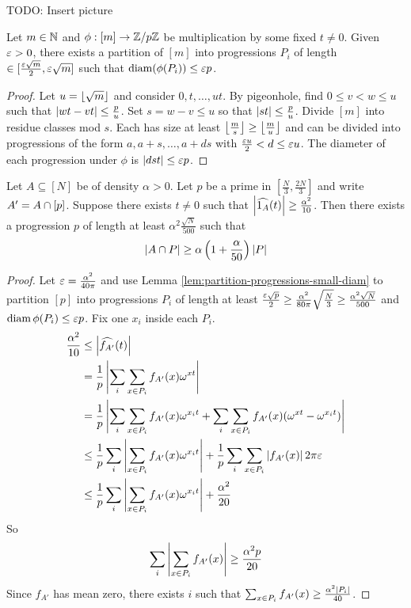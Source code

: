 \documentclass{article}
\begin{document}
TODO: Insert picture

\begin{nlemma}\label{lem:partition-progressions-small-diam}
  Let $m \in \mathbb N$ and $\phi : [m] \to \mathbb Z/p\mathbb Z$ be multiplication by some fixed $t \ne 0$. Given $\varepsilon > 0$, there exists a partition of $[m]$ into progressions $P_i$ of length $\in [\frac{\varepsilon\sqrt m}2, \varepsilon\sqrt m]$ such that $\operatorname{diam}(\phi(P_i)) \le \varepsilon p$.
\end{nlemma}
\begin{proof}
  Let $u = \left\lfloor \sqrt m\right\rfloor$ and consider $0, t, \dots, ut$. By pigeonhole, find $0 \le v < w \le u$ such that $\left\lvert wt - vt\right\rvert \le \frac pu$. Set $s = w - v \le u$ so that $\left\lvert st\right\rvert \le \frac pu$. Divide $[m]$ into residue classes mod $s$. Each has size at least $\left\lfloor \frac ms\right\rfloor \ge \left\lfloor \frac mu\right\rfloor$ and can be divided into progressions of the form $a, a + s, \dots, a + ds$ with $\frac{\varepsilon u}2 < d \le \varepsilon u$. The diameter of each progression under $\phi$ is $\left\lvert dst\right\rvert \le \varepsilon p$.
\end{proof}

\begin{nlemma}
  Let $A \subseteq [N]$ be of density $\alpha > 0$. Let $p$ be a prime in $[\frac N3, \frac{2N}3]$ and write $A' = A \cap [p]$. Suppose there exists $t \ne 0$ such that $\left\lvert \widehat{1_A}(t)\right\rvert \ge \frac{\alpha^2}{10}$. Then there exists a progression $p$ of length at least $\alpha^2 \frac{\sqrt N}{500}$ such that
  $$\left\lvert A \cap P\right\rvert \ge \alpha\left(1 + \frac\alpha{50}\right)\left\lvert P\right\rvert$$
\end{nlemma}
\begin{proof}
  Let $\varepsilon = \frac{\alpha^2}{40\pi}$ and use Lemma \ref{lem:partition-progressions-small-diam} to partition $[p]$ into progressions $P_i$ of length at least $\frac{\varepsilon \sqrt p}2 \ge \frac{\alpha^2}{80\pi}\sqrt{\frac N3} \ge \frac{\alpha^2\sqrt N}{500}$ and $\operatorname{diam} \phi(P_i) \le \varepsilon p$. Fix one $x_i$ inside each $P_i$.
  \begin{align*}
    \frac{\alpha^2}{10}
    & \le \left\lvert \widehat{f_{A'}}(t)\right\rvert \\
    & = \frac 1p\left\lvert \sum_i\sum_{x \in P_i} f_{A'}(x)\omega^{xt}\right\rvert \\
    & = \frac 1p\left\lvert \sum_i\sum_{x \in P_i} f_{A'}(x)\omega^{x_it} + \sum_i\sum_{x \in P_i} f_{A'}(x)(\omega^{xt} - \omega^{x_it})\right\rvert \\
    & \le \frac 1p\sum_i\left\lvert \sum_{x \in P_i} f_{A'}(x)\omega^{x_it}\right\rvert + \frac 1p\sum_i\sum_{x \in P_i} \left\lvert f_{A'}(x)\right\rvert 2\pi\varepsilon \\
    & \le \frac 1p\sum_i\left\lvert \sum_{x \in P_i} f_{A'}(x)\omega^{x_it}\right\rvert + \frac{\alpha^2}{20}
  \end{align*}
  So
  $$\sum_i \left\lvert \sum_{x \in P_i} f_{A'}(x)\right\rvert \ge \frac{\alpha^2p}{20}$$
  Since $f_{A'}$ has mean zero, there exists $i$ such that $\sum_{x \in P_i} f_{A'}(x) \ge \frac{\alpha^2\left\lvert P_i\right\rvert}{40}$.
\end{proof}
\end{document}
